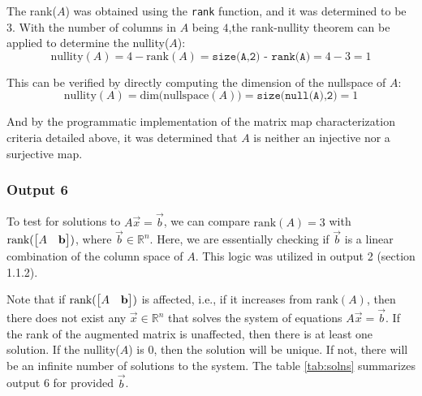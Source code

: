 \documentclass[10pt]{article}
\begin{document}
The rank($A$) was obtained using the \texttt{rank} function, and it was determined to be $3$. With the number of columns in $A$ being $4$,the rank-nullity theorem can be applied to determine the nullity($A$):
\begin{equation*}
    \text{nullity}(A) = 4 - \text{rank}(A) = \texttt{size(A,2) - rank(A)}= 4 - 3 = 1
\end{equation*}

This can be verified by directly computing the dimension of the nullspace of $A$:
\begin{equation*}
    \text{nullity}(A) = \text{dim(nullspace}(A)) = \texttt{size(null(A),2)} = 1
\end{equation*}

And by the programmatic implementation of the matrix map characterization criteria detailed above, it was determined that $A$ is neither an injective nor a surjective map.

\subsubsection{Output 6}
To test for solutions to $A\vec{x} = \vec{b}$, we can compare $\text{rank}(A) = 3$ with $\text{rank}(\begin{bmatrix} A & \mathbf{b} \end{bmatrix})$, where $\vec{b} \in \mathbb{R}^n$. Here, we are essentially checking if $\vec{b}$ is a linear combination of the column space of $A$. This logic was utilized in output 2 (section 1.1.2).

Note that if $\text{rank}(\begin{bmatrix} A & \mathbf{b} \end{bmatrix})$ is affected, i.e., if it increases from $\text{rank}(A)$, then there does not exist any $\vec{x}\in \mathbb{R}^n$ that solves the system of equations $A\vec{x} = \vec{b}$. If the rank of the augmented matrix is unaffected, then there is at least one solution. If the nullity($A$) is $0$, then the solution will be unique. If not, there will be an infinite number of solutions to the system. The table \ref{tab:solns} summarizes output 6 for provided $\vec{b}$.
\end{document}
